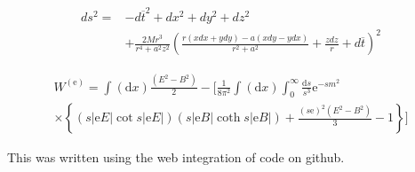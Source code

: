 \documentclass[11pt,a4paper]{book}
\begin{document}
	
\begin{equation}
\left.\begin{aligned} d s ^ { 2 } = & - d \overline { t } ^ { 2 } + d x ^ { 2 } + d y ^ { 2 } + d z ^ { 2 } \\ & + \frac { 2 M r ^ { 3 } } { r ^ { 4 } + a ^ { 2 } z ^ { 2 } } \left( \frac { r ( x d x + y d y ) - a ( x d y - y d x ) } { r ^ { 2 } + a ^ { 2 } } + \frac { z d z } { r } + d \overline { t } \right) ^ { 2 } \end{aligned} \right.    
\end{equation}


\begin{equation}
    \left. \begin{array} { c } { W ^ { ( \mathrm { e } ) } = \int ( \mathrm { d } x ) \frac { \left( E ^ { 2 } - B ^ { 2 } \right) } { 2 } - [ \frac { 1 } { 8 \pi ^ { 2 } } \int ( \mathrm { d } x ) \int _ { 0 } ^ { \infty } \frac { \mathrm { d } s } { s ^ { 3 } } \mathrm { e } ^ { - s m ^ { 2 } } } \\ { \times \left\{ ( s | \mathrm { e } E | \cot s | \mathrm { e } E | ) ( s | \mathrm { e } B | \operatorname { coth } s | \mathrm { e } B | ) + \frac { ( s \mathrm { e } ) ^ { 2 } \left( E ^ { 2 } - B ^ { 2 } \right) } { 3 } - 1 \right\} ] } \end{array} \right.
\end{equation}


This was written using the web integration of code on github.











\printindex
\end{document}
